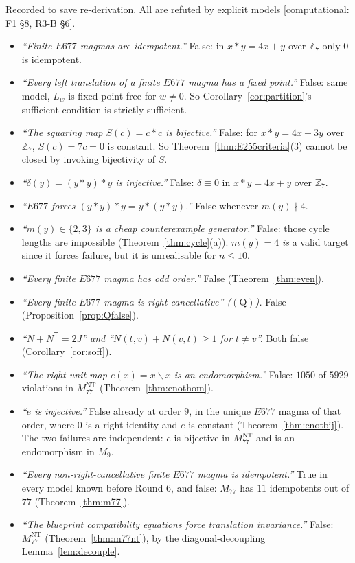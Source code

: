 \documentclass[11pt]{article}
\theoremstyle{plain}
\theoremstyle{definition}
\theoremstyle{remark}
\numberwithin{equation}{section}
\newcommand{\Z}{\mathbb{Z}}
\newcommand{\op}{\mathbin{*}}
\newcommand{\statusbox}[1]{{\small\sloppy\textsf{[#1]}}}
\newcommand{\COMP}[1]{\statusbox{computational: #1}}
\begin{document}
Recorded to save re-derivation. All are refuted by explicit models
\COMP{F1 \S8, R3-B \S6}.
\begin{itemize}
\item \emph{``Finite $E677$ magmas are idempotent.''} False: in $x\op y = 4x+y$ over $\Z_7$
only $0$ is idempotent.
\item \emph{``Every left translation of a finite $E677$ magma has a fixed point.''} False:
same model, $L_w$ is fixed-point-free for $w\ne0$. So Corollary~\ref{cor:partition}'s
sufficient condition is strictly sufficient.
\item \emph{``The squaring map $S(c) = c\op c$ is bijective.''} False: for $x\op y = 4x+3y$
over $\Z_7$, $S(c) = 7c = 0$ is constant. So Theorem~\ref{thm:E255criteria}(3) cannot be
closed by invoking bijectivity of $S$.
\item \emph{``$\delta(y) = (y\op y)\op y$ is injective.''} False: $\delta\equiv0$ in
$x\op y = 4x+y$ over $\Z_7$.
\item \emph{``$E677$ forces $(y\op y)\op y = y\op(y\op y)$.''} False whenever $m(y)\nmid4$.
\item \emph{``$m(y)\in\{2,3\}$ is a cheap counterexample generator.''} False: those cycle
lengths are impossible (Theorem~\ref{thm:cycle}(a)). $m(y)=4$ \emph{is} a valid target since
it forces failure, but it is unrealisable for $n\le10$.
\item \emph{``Every finite $E677$ magma has odd order.''} False (Theorem~\ref{thm:even}).
\item \emph{``Every finite $E677$ magma is right-cancellative'' ($(\mathrm{Q})$).} False
(Proposition~\ref{prop:Qfalse}).
\item \emph{``$N+N^{\mathsf T} = 2J$'' and ``$N(t,v)+N(v,t)\ge1$ for $t\ne v$''.} Both false
(Corollary~\ref{cor:soff}).
\item \emph{``The right-unit map $e(x) = x\backslash x$ is an endomorphism.''} False:
$1050$ of $5929$ violations in $M_{77}^{\mathrm{NT}}$ (Theorem~\ref{thm:enothom}).
\item \emph{``$e$ is injective.''} False already at order $9$, in the unique $E677$ magma of
that order, where $0$ is a right identity and $e$ is constant
(Theorem~\ref{thm:enotbij}). The two failures are independent: $e$ is bijective in
$M_{77}^{\mathrm{NT}}$ and is an endomorphism in $M_9$.
\item \emph{``Every non-right-cancellative finite $E677$ magma is idempotent.''} True in
every model known before Round 6, and false: $M_{77}$ has $11$ idempotents out of $77$
(Theorem~\ref{thm:m77}).
\item \emph{``The blueprint compatibility equations force translation invariance.''} False:
$M_{77}^{\mathrm{NT}}$ (Theorem~\ref{thm:m77nt}), by the diagonal-decoupling
Lemma~\ref{lem:decouple}.
\end{itemize}
\end{document}
